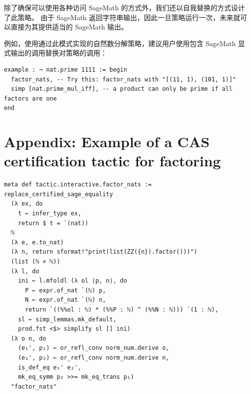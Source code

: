 \documentclass[sigplan,10pt,nonacm,
screen]{acmart} \settopmatter{printfolios=true,printccs=false,printacmref=false}
\begin{document}
除了确保可以使用各种访问 SageMath 的方式外，我们还以自我替换的方式设计了此策略。
由于 SageMath 返回字符串输出，因此一旦策略运行一次，未来就可以直接为其提供适当的 SageMath 输出。

例如，使用通过此模式实现的自然数分解策略，建议用户使用包含 SageMath 显式输出的调用替换对策略的调用：
\begin{lstlisting}
example : ¬ nat.prime 1111 := begin
  factor_nats, -- Try this: factor_nats with "[(11, 1), (101, 1)]"
  simp [nat.prime_mul_iff], -- a product can only be prime if all factors are one
end
\end{lstlisting}

\section{Appendix: Example of a CAS certification tactic for factoring}
\label{app:factor_nats}
\begin{lstlisting}
meta def tactic.interactive.factor_nats := replace_certified_sage_equality
  (λ ex, do
    t ← infer_type ex,
    return $ t = `(nat))
  ℕ
  (λ e, e.to_nat)
  (λ n, return sformat!"print(list(ZZ({n}).factor()))")
  (list (ℕ × ℕ))
  (λ l, do
    ini ← l.mfoldl (λ ol ⟨p, n⟩, do
      P ← expr.of_nat `(ℕ) p,
      N ← expr.of_nat `(ℕ) n,
      return `((%%ol : ℕ) * (%%P : ℕ) ^ (%%N : ℕ))) `(1 : ℕ),
    sl ← simp_lemmas.mk_default,
    prod.fst <$> simplify sl [] ini)
  (λ o n, do
    (e₁', p₁) ← or_refl_conv norm_num.derive o,
    (e₂', p₂) ← or_refl_conv norm_num.derive n,
    is_def_eq e₁' e₂',
    mk_eq_symm p₂ >>= mk_eq_trans p₁)
  "factor_nats"
\end{lstlisting}




\end{document}
